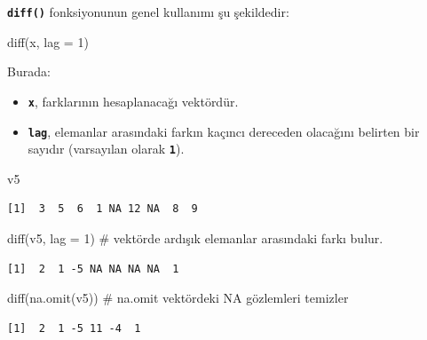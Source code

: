 \documentclass[
  letterpaper,
  DIV=11,
  numbers=noendperiod]{scrreprt}
\newenvironment{Shaded}{\begin{snugshade}}{\end{snugshade}}
\newcommand{\AttributeTok}[1]{\textcolor[rgb]{0.40,0.45,0.13}{#1}}
\newcommand{\CommentTok}[1]{\textcolor[rgb]{0.37,0.37,0.37}{#1}}
\newcommand{\DecValTok}[1]{\textcolor[rgb]{0.68,0.00,0.00}{#1}}
\newcommand{\FunctionTok}[1]{\textcolor[rgb]{0.28,0.35,0.67}{#1}}
\newcommand{\NormalTok}[1]{\textcolor[rgb]{0.00,0.23,0.31}{#1}}
\begin{document}
\textbf{\texttt{diff()}} fonksiyonunun genel kullanımı şu şekildedir:

\begin{Shaded}
\begin{Highlighting}[]
\FunctionTok{diff}\NormalTok{(x, }\AttributeTok{lag =} \DecValTok{1}\NormalTok{)}
\end{Highlighting}
\end{Shaded}

Burada:

\begin{itemize}
\item
  \textbf{\texttt{x}}, farklarının hesaplanacağı vektördür.
\item
  \textbf{\texttt{lag}}, elemanlar arasındaki farkın kaçıncı dereceden
  olacağını belirten bir sayıdır (varsayılan olarak
  \textbf{\texttt{1}}).
\end{itemize}

\begin{Shaded}
\begin{Highlighting}[]
\NormalTok{v5}
\end{Highlighting}
\end{Shaded}

\begin{verbatim}
[1]  3  5  6  1 NA 12 NA  8  9
\end{verbatim}

\begin{Shaded}
\begin{Highlighting}[]
\FunctionTok{diff}\NormalTok{(v5,  }\AttributeTok{lag =} \DecValTok{1}\NormalTok{) }\CommentTok{\# vektörde ardışık elemanlar arasındaki farkı bulur.}
\end{Highlighting}
\end{Shaded}

\begin{verbatim}
[1]  2  1 -5 NA NA NA NA  1
\end{verbatim}

\begin{Shaded}
\begin{Highlighting}[]
\FunctionTok{diff}\NormalTok{(}\FunctionTok{na.omit}\NormalTok{(v5)) }\CommentTok{\# na.omit vektördeki NA gözlemleri temizler}
\end{Highlighting}
\end{Shaded}

\begin{verbatim}
[1]  2  1 -5 11 -4  1
\end{verbatim}
\end{document}
